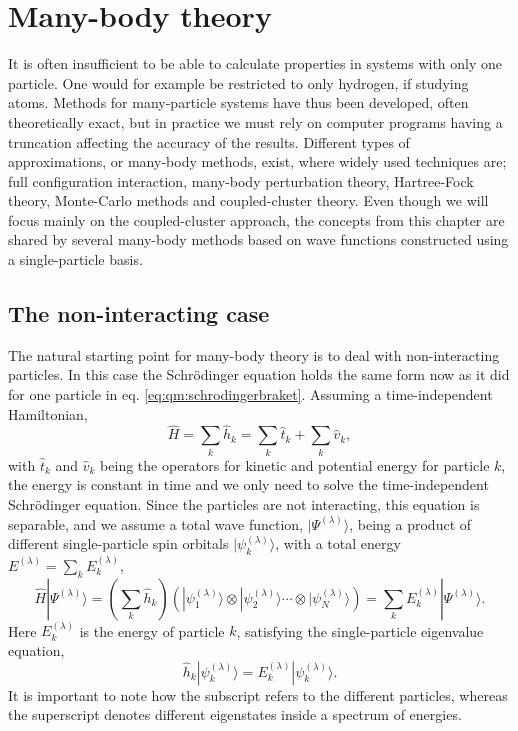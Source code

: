 \chapter{Many-body theory}
\label{ch:manybody}
It is often insufficient to be able to calculate properties in systems with only one particle.
One would for example be restricted to only hydrogen, if studying atoms.
Methods for many-particle systems have thus been developed, often theoretically exact, but in practice we must rely on computer programs having a truncation affecting the accuracy of the results.
Different types of approximations, or many-body methods, exist, where widely used techniques are; full configuration interaction, many-body perturbation theory, Hartree-Fock theory, Monte-Carlo methods and coupled-cluster theory.
Even though we will focus mainly on the coupled-cluster approach, the concepts from this chapter are shared by several many-body methods based on wave functions constructed using a single-particle basis.


\section{The non-interacting case}
The natural starting point for many-body theory is to deal with non-interacting particles.
In this case the Schrödinger equation holds the same form now as it did for one particle in eq. \eqref{eq:qm:schrodingerbraket}.
Assuming a time-independent Hamiltonian,
\begin{equation}
\hat{H} = \sum_k \hat{h}_k =  \sum_k \hat{t}_k  + \sum_k \hat{v}_k ,
\end{equation}
with $\hat{t}_k$ and $\hat{v}_k$ being the operators for kinetic and potential energy for particle $k$, the energy is constant in time and we only need to solve the time-independent Schrödinger equation.
Since the particles are not interacting, this equation is separable, and we assume a total wave function, $|\Psi^{(\lambda)} \rangle$, being a product of different single-particle spin orbitals $|\psi_k^{(\lambda)}\rangle$, with a total energy $E^{(\lambda)}=\sum_k E_k^{(\lambda)}$,
\begin{equation}
\hat{H}|\Psi^{(\lambda)} \rangle = 
\left(\sum_k \hat{h}_k\right) \left(|\psi_1^{(\lambda)}\rangle \otimes |\psi_2^{(\lambda)}\rangle 
\cdots \otimes |\psi_N^{(\lambda)}\rangle \right)
=  \sum_k E_k^{(\lambda)} |\Psi^{(\lambda)} \rangle .
\end{equation}
Here $E_k^{(\lambda)}$ is the energy of particle $k$, satisfying the single-particle eigenvalue equation,
\begin{equation}
\label{eq:manybody:nonInter}
\hat{h}_k |\psi_k^{(\lambda)} \rangle = E_k^{(\lambda)} |\psi_k^{(\lambda)} \rangle .
\end{equation}
It is important to note how the subscript refers to the different particles, whereas the superscript denotes different eigenstates inside a spectrum of energies.

